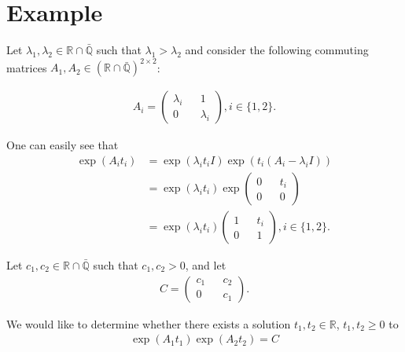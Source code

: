\section{Example}

Let $\lambda_{1}, \lambda_{2} \in \mathbb{R} \cap \bar{\mathbb{Q}}$ such that $\lambda_{1} > \lambda_{2}$ and consider the following commuting matrices $A_{1}, A_{2} \in (\mathbb{R} \cap \bar{\mathbb{Q}})^{2 \times 2}$:

\begin{align*}
A_{i} = \begin{pmatrix} \lambda_{i} && 1 \\ 0 && \lambda_{i} \end{pmatrix}, i \in \lbrace 1, 2 \rbrace .
\end{align*}

One can easily see that
\begin{align*}
\exp(A_{i} t_{i}) &= \exp(\lambda_{i} t_{i} I) \exp(t_{i} (A_{i} - \lambda_{i} I)) \\
&= \exp(\lambda_{i} t_{i})
\exp \begin{pmatrix} 0 && t_{i} \\ 0 && 0 \end{pmatrix} \\
&= \exp (\lambda_{i} t_{i})
\begin{pmatrix} 1 && t_{i} \\ 0 && 1 \end{pmatrix}, i \in \lbrace 1, 2 \rbrace .
\end{align*}

Let $c_{1}, c_{2} \in \mathbb{R} \cap \bar{\mathbb{Q}}$ such that $c_{1}, c_{2} > 0$, and let
\begin{align*}
C = \begin{pmatrix} c_{1} && c_{2} \\ 0 && c_{1} \end{pmatrix} .
\end{align*}

We would like to determine whether there exists a solution $t_{1}, t_{2} \in \mathbb{R}$, $t_{1}, t_{2} \geq 0$ to
\begin{align*}
\exp(A_{1} t_{1}) \exp(A_{2} t_{2}) = C
\end{align*}

